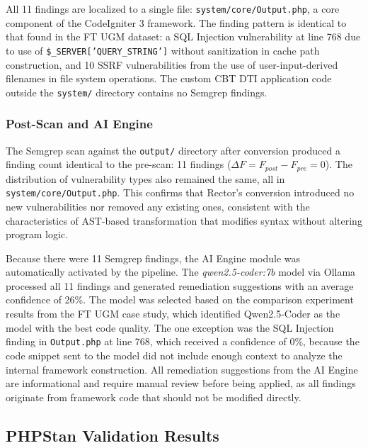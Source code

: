 All 11 findings are localized to a single file: \texttt{system/core/\allowbreak Output.php}, a core component of the CodeIgniter 3 framework. The finding pattern is identical to that found in the FT UGM dataset: a SQL Injection vulnerability at line 768 due to use of \texttt{\$\_SERVER['QUERY\_STRING']} without sanitization in cache path construction, and 10 SSRF vulnerabilities from the use of user-input-derived filenames in file system operations. The custom CBT DTI application code outside the \texttt{system/} directory contains no Semgrep findings.

\subsubsection{Post-Scan and AI Engine}

The Semgrep scan against the \texttt{output/} directory after conversion produced a finding count identical to the pre-scan: 11 findings ($\Delta F = F_{post} - F_{pre} = 0$). The distribution of vulnerability types also remained the same, all in \texttt{system/core/\allowbreak Output.php}. This confirms that Rector's conversion introduced no new vulnerabilities nor removed any existing ones, consistent with the characteristics of AST-based transformation that modifies syntax without altering program logic.

Because there were 11 Semgrep findings, the AI Engine module was automatically activated by the pipeline. The \textit{qwen2.5-coder:7b} model via Ollama processed all 11 findings and generated remediation suggestions with an average confidence of 26\%. The model was selected based on the comparison experiment results from the FT UGM case study, which identified Qwen2.5-Coder as the model with the best code quality. The one exception was the SQL Injection finding in \texttt{Output.php} at line 768, which received a confidence of 0\%, because the code snippet sent to the model did not include enough context to analyze the internal framework construction. All remediation suggestions from the AI Engine are informational and require manual review before being applied, as all findings originate from framework code that should not be modified directly.

\subsection{PHPStan Validation Results}

